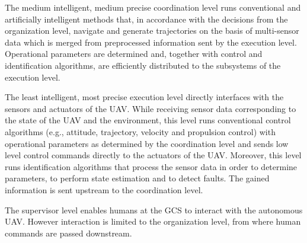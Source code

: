 The medium intelligent, medium precise coordination level runs conventional and artificially intelligent methods that, 
in accordance with the decisions from the organization level,
navigate and generate trajectories on the basis of multi-sensor data which is merged from preprocessed information sent by the execution level. 
Operational parameters are determined and, together with control and identification algorithms, are efficiently distributed to the subsystems of the execution level.

The least intelligent, most precise execution level directly interfaces with the sensors and actuators of the UAV. 
While receiving sensor data corresponding to the state of the UAV and the environment, 
this level runs conventional control algorithms (e.g., attitude, trajectory, velocity and propulsion control) with operational parameters as determined by the coordination level 
and sends low level control commands directly to the actuators of the UAV.
Moreover, this level runs identification algorithms that process the sensor data in order to determine parameters, to perform state estimation and to detect faults.
The gained information is sent upstream to the coordination level.

The supervisor level enables humans at the GCS to interact with the autonomous UAV.
However interaction is limited to the organization level, from where human commands are passed downstream.

